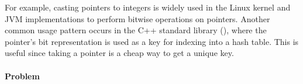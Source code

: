 For example, casting pointers to integers is
widely used in the Linux kernel and JVM implementations to perform bitwise operations on pointers.
Another common usage pattern occurs in the C++ standard library (),
where the pointer's bit representation is used as a key for indexing into
a hash table.
This is useful since taking a pointer is a cheap way to get a unique key.


%






\paragraph{Problem}


